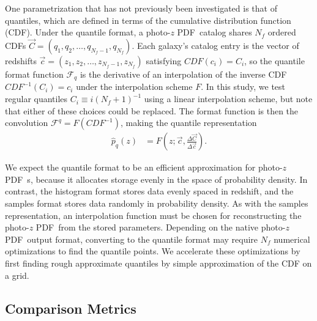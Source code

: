 \documentclass[\docopts]{\docclass}
\newcommand{\qp}{\texttt{qp}\xspace}
\newcommand{\pz}{photo-$z$ PDF\xspace}
\begin{document}
One parametrization that has not previously been investigated is that of
quantiles, which are defined in terms of the cumulative distribution function
(CDF).  Under the quantile format, a \pz\ catalog shares $N_{f}$ ordered CDFs
$\vec{C}=(q_{1}, q_{2}, \dots, q_{N_{f}-1}, q_{N_{f}})$.  Each galaxy's catalog
entry is the vector of redshifts $\vec{c}=(z_{1}, z_{2}, \dots, z_{N_{f}-1},
z_{N_{f}})$ satisfying $CDF(c_{i})=C_{i}$, so the quantile format function
$\mathcal{F}_{q}$ is the derivative of an interpolation of the inverse CDF
$CDF^{-1}(C_{i})=c_{i}$ under the interpolation scheme $F$.  In this study, we
test regular quantiles $C_{i}\equiv i(N_{f}+1)^{-1}$ using a linear
interpolation scheme, but note that either of these choices could be replaced.  The format function is then the convolution
$\mathcal{F}^{q}=F(CDF^{-1})$, making the quantile representation
\begin{align}
  \label{eq:quantiles}
  \hat{p}_{q}(z) &= F(z; \vec{c}, \frac{\Delta\vec{C}}{\Delta\vec{c}}).
\end{align}


We expect the quantile format to be an efficient approximation for \pz\ s, because it
allocates storage evenly in the space of probability density. In contrast, the
histogram format stores data evenly spaced in redshift, and the samples format
stores data randomly in probability density.  As with the samples
representation, an interpolation function must be chosen for reconstructing the
\pz\ from the stored parameters.  Depending on the native \pz\ output format,
converting to the quantile format may require $N_{f}$ numerical optimizations to find the quantile points. We accelerate these optimizations by first finding rough approximate quantiles by simple approximation of the CDF on a grid.





\subsection{Comparison Metrics}
\label{sec:metric}
\end{document}
